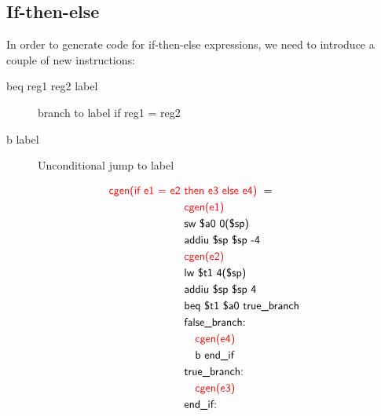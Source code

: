 \subsection{If-then-else}
In order to generate code for \textsf{if-then-else} expressions, we need to introduce a couple of new instructions:
\begin{description}
\item[beq reg1 reg2 label] branch to label if reg1 = reg2
\item[b label] Unconditional jump to label
\end{description}
\begin{equation*}\begin{split}
\textsf{\color{red}cgen(if e1 = e2 }&\textsf{\color{red}then e3 else e4) }=\\
&\textsf{\color{red}cgen(e1)}\\
&\textsf{sw \$a0 0(\$sp)}\\
&\textsf{addiu \$sp \$sp -4}\\
&\textsf{\color{red}cgen(e2)}\\
&\textsf{lw \$t1 4(\$sp)}\\
&\textsf{addiu \$sp \$sp 4}\\
&\textsf{beq \$t1 \$a0 true\_branch}\\
&\textsf{false\_branch:}\\
&\textsf{\quad\color{red}cgen(e4)}\\
&\textsf{\quad b end\_if}\\
&\textsf{true\_branch:}\\
&\textsf{\quad\color{red}cgen(e3)}\\
&\textsf{end\_if:}
\end{split}\end{equation*}

